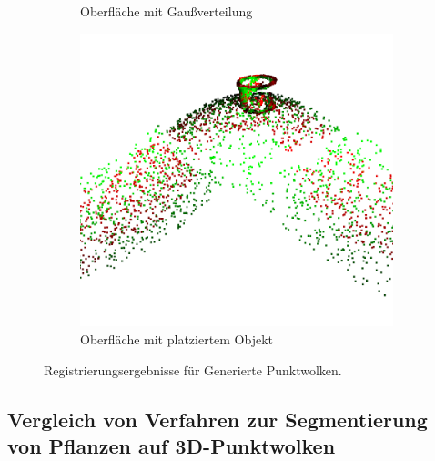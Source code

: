 \documentclass[12pt,titlepage, twoside]{article}
\begin{document}
\begin{figure}[htb]
\begin{subfigure}{0.3\textwidth}
  \caption{Oberfläche mit Gaußverteilung}
  \label{fig:registration:gauss}
\end{subfigure}\hfil
\begin{subfigure}{0.3\textwidth}
  \includegraphics[width=\linewidth]{./Images/Registration_Pot.png}
  \caption{Oberfläche mit platziertem Objekt}
  \label{fig:registration:pot}
\end{subfigure}
\caption{Registrierungsergebnisse für Generierte Punktwolken.}
\label{fig:registration:generated}
\end{figure}

\subsection{Vergleich von Verfahren zur Segmentierung von Pflanzen auf 3D-Punktwolken}
\end{document}

